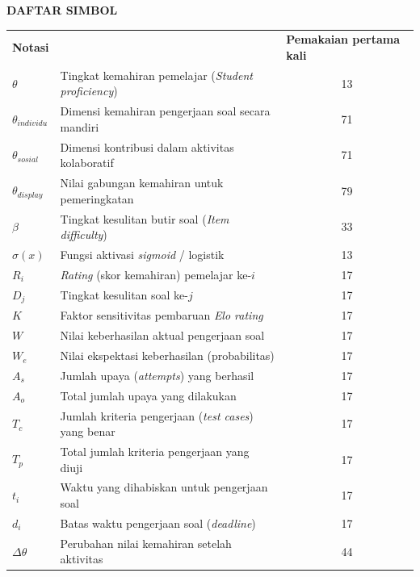 \cleardoublepage
\vspace{2cm}
\begin{center}
{\fontsize{14}{16.8}\selectfont\textbf{DAFTAR SIMBOL}}\\[1em]
\end{center}
\label{chap:simbol}
\setcounter{chapter}{0}
\setcounter{section}{0}
\vspace{2em}

\begin{longtable}{@{} l >{\raggedright\arraybackslash}p{6.5cm} c @{}}
\multicolumn{1}{l}{\textbf{Notasi}} & \multicolumn{1}{l}{\textbf{Deskripsi}} & \multicolumn{1}{l}{\parbox[c]{3.5cm}{\raggedright \textbf{Pemakaian pertama kali}}} \\

$\theta$ & Tingkat kemahiran pemelajar (\textit{Student proficiency}) & 13 \\
$\theta_{individu}$ & Dimensi kemahiran pengerjaan soal secara mandiri & 71 \\
$\theta_{sosial}$ & Dimensi kontribusi dalam aktivitas kolaboratif & 71 \\
$\theta_{display}$ & Nilai gabungan kemahiran untuk pemeringkatan & 79 \\
$\beta$ & Tingkat kesulitan butir soal (\textit{Item difficulty}) & 33 \\
$\sigma(x)$ & Fungsi aktivasi \textit{sigmoid} / logistik & 13 \\

$R_i$ & \textit{Rating} (skor kemahiran) pemelajar ke-$i$ & 17 \\
$D_j$ & Tingkat kesulitan soal ke-$j$ & 17 \\
$K$ & Faktor sensitivitas pembaruan \textit{Elo rating} & 17 \\
$W$ & Nilai keberhasilan aktual pengerjaan soal & 17 \\
$W_e$ & Nilai ekspektasi keberhasilan (probabilitas) & 17 \\
$A_s$ & Jumlah upaya (\textit{attempts}) yang berhasil & 17 \\
$A_o$ & Total jumlah upaya yang dilakukan & 17 \\
$T_c$ & Jumlah kriteria pengerjaan (\textit{test cases}) yang benar & 17 \\
$T_p$ & Total jumlah kriteria pengerjaan yang diuji & 17 \\
$t_i$ & Waktu yang dihabiskan untuk pengerjaan soal & 17 \\
$d_i$ & Batas waktu pengerjaan soal (\textit{deadline}) & 17 \\
$\Delta\theta$ & Perubahan nilai kemahiran setelah aktivitas & 44 \\


\end{longtable}
